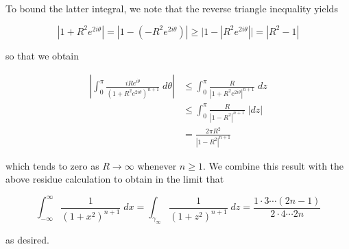\begin{solution}
  \pagebreak
  To bound the latter integral, we note that the reverse triangle inequality yields

  $$
  \left|1 + R^2 e^{2 i \theta}\right| = \left|1 - \left(-R^2 e^{2 i \theta}\right)\right| 
                                      \ge \Big| 1 - \left| R^2 e^{2 i \theta} \right| \Big| 
                                      = \left|R^2 - 1\right|
  $$

  so that we obtain

  \begin{align*}
    \left|\int_0^{\pi} { \frac{i R e^{i \theta}}{\left(1 + R^2 e^{2 i \theta}\right)^{n+1}} \; d\theta } \right|
      &\le \int_0^{\pi} { \frac{R}{\left| 1 + R^2 e^{2 i \theta} \right|^{n+1}} \; dz} \\
      &\le \int_0^{\pi} { \frac{R}{\left| 1 - R^2 \right|^{n+1}} \; |dz|} \\
      &= \frac{2 \pi R^2}{\left| 1 - R^2 \right|^{n+1}}
  \end{align*}

  which tends to zero as $R \to \infty$ whenever $n \ge 1$. We combine this result with the above residue calculation to 
  obtain in the limit that 

  $$
    \int_{-\infty}^{\infty} { \frac{1}{(1 + x^2)^{n+1}} \; dx } 
      = \int_{\gamma_{\infty}} { \frac{1}{(1 + z^2)^{n+1}} \; dz } 
      = \frac{1 \cdot 3 \cdots (2n - 1)}{2 \cdot 4 \cdots 2n}
  $$ 

  as desired.

  \ \\
\end{solution}